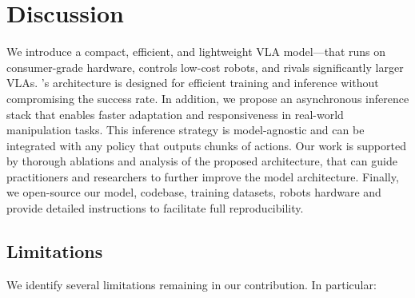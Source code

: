 \section{Discussion}

We introduce a compact, efficient, and lightweight  VLA model--\ours--that runs on consumer-grade hardware, controls low-cost robots, and rivals significantly larger VLAs. 
\ours's architecture is designed for efficient training and inference without compromising the success rate.
In addition, we propose an asynchronous inference stack that enables faster adaptation and responsiveness in real-world manipulation tasks. 
This inference strategy is model-agnostic and can be integrated with any policy that outputs chunks of actions. 
Our work is supported by thorough ablations and analysis of the proposed architecture, that can guide practitioners and researchers to further improve the model architecture. 
Finally, we open-source our model, codebase, training datasets, robots hardware and provide detailed instructions to facilitate full reproducibility.



\subsection{Limitations}
We identify several limitations remaining in our contribution. In particular:

